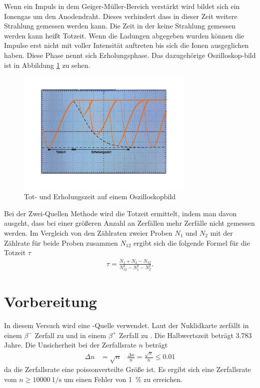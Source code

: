 \noindent
Wenn ein Impuls in dem Geiger-Müller-Bereich verstärkt wird bildet sich ein Ionengas um den Anodendraht.
Dieses verhindert dass in dieser Zeit weitere Strahlung gemessen werden kann.
Die Zeit in der keine Strahlung gemessen werden kann heißt Totzeit.
Wenn die Ladungen abgegeben wurden können die Impulse erst nicht mit voller Intensität auftreten bis sich die Ionen ausgeglichen haben.
Diese Phase nennt sich Erholungsphase. 
Das dazugehörige Oszilloskop-bild ist in Abbildung \ref{fig:03_teo} zu sehen.
\begin{figure}
    \centering
    \includegraphics[width = 0.75\textwidth]{14_v703/Abbildungen/tod.pdf}
    \caption{Tot- und Erholungszeit auf einem Oszilloskopbild}
    \label{fig:03_teo}
\end{figure}

Bei der Zwei-Quellen Methode wird die Totzeit ermittelt, indem man davon ausgeht, dass bei einer größeren Anzahl an Zerfällen mehr Zerfälle nicht gemessen werden. 
Im Vergleich von den Zählraten zweier Proben $N_1$ und $N_2$ mit der Zählrate für beide Proben zusammen $N_{12}$ ergibt sich die folgende Formel für die Totzeit $\tau$
\begin{align}
    \tau = \frac{N_1 + N_2 - N_{12}}{N_{12}^2 -N_{1}^2 - N_{2}^2 }.
    \label{eq:zwei_quellen}
\end{align}


\section{Vorbereitung}
In diesem Versuch wird eine -Quelle verwendet.
Laut der Nuklidkarte \cite{nuklidkarte} zerfällt  in einem $\beta^{-}$ Zerfall zu  und in einem $\beta^{+}$ Zerfall zu . 
Die Halbwertszeit beträgt \num{3.783} Jahre.
Die Unsicherheit bei der Zerfallsrate $n$ beträgt
\begin{align}
    \Delta n &= \sqrt{n} & \frac{\Delta n}{n} = \frac{\sqrt{n}}{n} \leq 0.01
\end{align}
da die Zerfallsrate eine poissonverteilte Größe ist.
Es ergibt sich  eine Zerfallsrate vom $n \geq \qty{10000}{1\per\second}$ um einen Fehler von \qty{1}{\percent} zu erreichen.